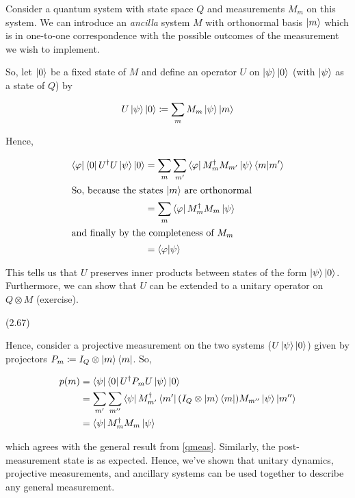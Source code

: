 \documentclass[main.tex]{subfiles}
\begin{document}
\begin{subappendices}
Consider a quantum system with state space $Q$ and measurements $M_m$ on this system. We can introduce an \textit{ancilla} system $M$ with orthonormal basis $\ket{m}$ which is in one-to-one correspondence with the possible outcomes of the measurement we wish to implement. 

So, let $\ket{0}$ be a fixed state of $M$ and define an operator $U$ on $\ket{\psi}\ket{0}$ (with $\ket{\psi}$ as a state of $Q$) by

\begin{align*}
U\ket{\psi}\ket{0} \coloneqq \sum_m M_m \ket{\psi}\ket{m}
\end{align*}

Hence,

\begin{align*}
\bra{\varphi}\bra{0}U^\dag U \ket{\psi}	 \ket{0} &= \sum_m \sum_{m'} \bra{\varphi} M_m^\dag M_{m'} \ket{\psi}\bra{m}\ket{m'} \\
\intertext{So, because the states $\ket{m}$ are orthonormal}
&= \sum_m\bra{\varphi} M_m^\dag M_{m} \ket{\psi} \\
\intertext{and finally by the completeness of $M_m$}
&= \bra{\varphi}\ket{\psi}
\end{align*}

This tells us that $U$ preserves inner products between states of the form $\ket{\psi}\ket{0}$. Furthermore, we can show that $U$ can be extended to a unitary operator on $Q \otimes M$ (exercise).

\begin{exercise}
(2.67)
\end{exercise}

Hence, consider a projective measurement on the two systems ($U\ket{\psi}\ket{0}$) given by projectors $P_m \coloneqq I_Q \otimes \ket{m}\bra{m}$. So,

\begin{align*}
p(m) &= \bra{\psi} \bra{0} U^\dag P_m U \ket{\psi} \ket{0} \\
&= \sum_{m'}\sum_{m''} \bra{\psi} M_{m'}^\dag \bra{m'} (I_Q \otimes \ket{m}\bra{m})M_{m''} \ket{\psi} \ket{m''} \\
&= \bra{\psi} M_m^\dag M_m \ket{\psi}
\end{align*}

which agrees with the general result from \ref{qmeas}. Similarly, the post-measurement state is as expected. Hence, we've shown that unitary dynamics, projective measurements, and ancillary systems can be used together to describe any general measurement.


\end{subappendices}
\end{document}
